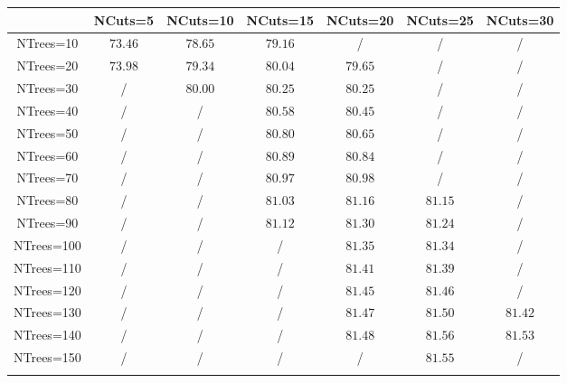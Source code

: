 \centering
\begin{tabular}{ccccccc} \toprule\toprule
 & NCuts=5 & NCuts=10 & NCuts=15 & NCuts=20 & NCuts=25 & NCuts=30\\\midrule
NTrees=10 & $73.46$ & $78.65$ & $79.16$ &  / &  / &  /\\
NTrees=20 & $73.98$ & $79.34$ & $80.04$ & $79.65$ &  / &  /\\
NTrees=30 &  / & $80.00$ & $80.25$ & $80.25$ &  / &  /\\
NTrees=40 &  / &  / & $80.58$ & $80.45$ &  / &  /\\
NTrees=50 &  / &  / & $80.80$ & $80.65$ &  / &  /\\
NTrees=60 &  / &  / & $80.89$ & $80.84$ &  / &  /\\
NTrees=70 &  / &  / & $80.97$ & $80.98$ &  / &  /\\
NTrees=80 &  / &  / & $81.03$ & $81.16$ & $81.15$ &  /\\
NTrees=90 &  / &  / & $81.12$ & $81.30$ & $81.24$ &  /\\
NTrees=100 &  / &  / &  / & $81.35$ & $81.34$ &  /\\
NTrees=110 &  / &  / &  / & $81.41$ & $81.39$ &  /\\
NTrees=120 &  / &  / &  / & $81.45$ & $81.46$ &  /\\
NTrees=130 &  / &  / &  / & $81.47$ & $81.50$ & $81.42$\\
NTrees=140 &  / &  / &  / & $81.48$ & $81.56$ & $81.53$\\
NTrees=150 &  / &  / &  / &  / & $81.55$ &  /\\
\bottomrule\bottomrule\\
\end{tabular}
